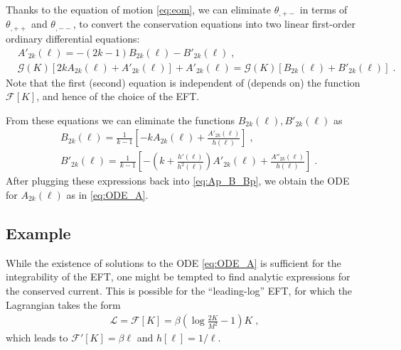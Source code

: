 \documentclass[12pt]{article}
\begin{document}
Thanks to the equation of motion \eqref{eq:eom},
we can eliminate $\theta_{,+-}$ in terms of $\theta_{,++}$ and $\theta_{,--}$,
to convert the conservation equations into two linear first-order ordinary differential equations:
\begin{align}
&A'_{2k}(\ell)  = -(2k-1) B_{2k}(\ell) %
- B'_{2k}(\ell) \;,
\label{eq:Ap_B_Bp}\\
&\mathcal{G}(K) [2k A_{2k}(\ell) + A'_{2k}(\ell) ]
 + A'_{2k}(\ell) = \mathcal{G}(K) [B_{2k}(\ell) + B'_{2k}(\ell)] \;.
\end{align}
Note that the first (second) equation is independent of (depends on) the function $\mathcal{F}[K]$, and hence of the choice of the EFT.

From these equations we can eliminate the functions $B_{2k}(\ell), B'_{2k}(\ell)$ as 
\begin{align}
& B_{2k}(\ell) = \frac{1}{k-1} \left[-k A_{2k}(\ell) + \frac{A'_{2k}(\ell)}{h(\ell)}\right] \;, \\
& B'_{2k}(\ell) = \frac{1}{k-1} \left[-\left(k + \frac{h'(\ell)}{h^2(\ell)} \right)  A'_{2k}(\ell) + \frac{A''_{2k}(\ell)}{h(\ell)}\right] \;.
\end{align}
    After plugging these expressions back into \eqref{eq:Ap_B_Bp},
we obtain the ODE for $A_{2k}(\ell)$ as in 
\eqref{eq:ODE_A}.

\subsection{Example}

While the existence of solutions to the ODE
\eqref{eq:ODE_A} is sufficient for the integrability of the EFT,
one might be tempted to find analytic expressions for the conserved current.
This is possible for the ``leading-log'' EFT, for which the Lagrangian takes the form
\begin{align}
\mathcal{L} = \mathcal{F}[K]= \beta \left(\log \frac{2K}{M^2} -1 \right) K \;,
\end{align}
which leads to $\mathcal{F}'[K] = \beta \ell$ and $h[\ell] = 1/\ell$.
\end{document}
